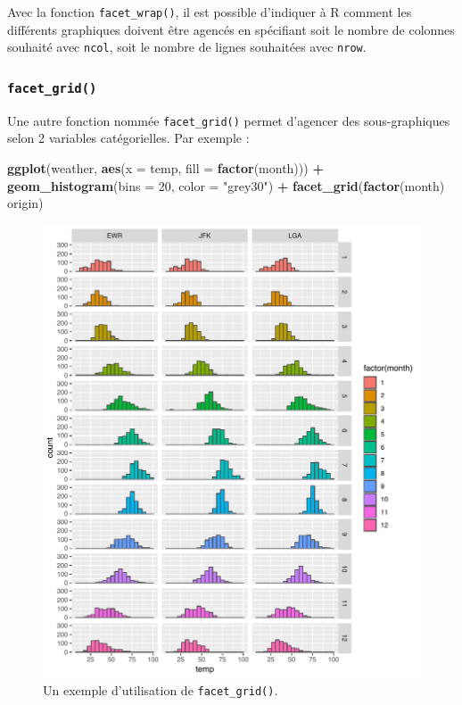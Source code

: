 \documentclass[a4paperpaper,]{article}
\newenvironment{Shaded}{\begin{snugshade}}{\end{snugshade}}
\newcommand{\KeywordTok}[1]{\textcolor[rgb]{0.13,0.29,0.53}{\textbf{#1}}}
\newcommand{\DataTypeTok}[1]{\textcolor[rgb]{0.13,0.29,0.53}{#1}}
\newcommand{\DecValTok}[1]{\textcolor[rgb]{0.00,0.00,0.81}{#1}}
\newcommand{\StringTok}[1]{\textcolor[rgb]{0.31,0.60,0.02}{#1}}
\newcommand{\OperatorTok}[1]{\textcolor[rgb]{0.81,0.36,0.00}{\textbf{#1}}}
\newcommand{\NormalTok}[1]{#1}
\theoremstyle{definition}
\theoremstyle{definition}
\theoremstyle{definition}
\theoremstyle{remark}
\begin{document}
Avec la fonction \texttt{facet\_wrap()}, il est possible d'indiquer à R
comment les différents graphiques doivent être agencés en spécifiant
soit le nombre de colonnes souhaité avec \texttt{ncol}, soit le nombre
de lignes souhaitées avec \texttt{nrow}.

\subsubsection{\texorpdfstring{\texttt{facet\_grid()}}{facet\_grid()}}\label{facet_grid}

Une autre fonction nommée \texttt{facet\_grid()} permet d'agencer des
sous-graphiques selon 2 variables catégorielles. Par exemple :

\begin{Shaded}
\begin{Highlighting}[]
\KeywordTok{ggplot}\NormalTok{(weather, }\KeywordTok{aes}\NormalTok{(}\DataTypeTok{x =}\NormalTok{ temp, }\DataTypeTok{fill =} \KeywordTok{factor}\NormalTok{(month))) }\OperatorTok{+}
\StringTok{  }\KeywordTok{geom_histogram}\NormalTok{(}\DataTypeTok{bins =} \DecValTok{20}\NormalTok{, }\DataTypeTok{color =} \StringTok{"grey30"}\NormalTok{) }\OperatorTok{+}
\StringTok{  }\KeywordTok{facet_grid}\NormalTok{(}\KeywordTok{factor}\NormalTok{(month) }\OperatorTok{~}\StringTok{ }\NormalTok{origin)}
\end{Highlighting}
\end{Shaded}

\begin{figure}[htpb]

{\centering \includegraphics[width=0.9\linewidth]{figure/grid-1} 

}

\caption{Un exemple d'utilisation de \texttt{facet\_grid()}.}\label{fig:grid}
\end{figure}
\end{document}
